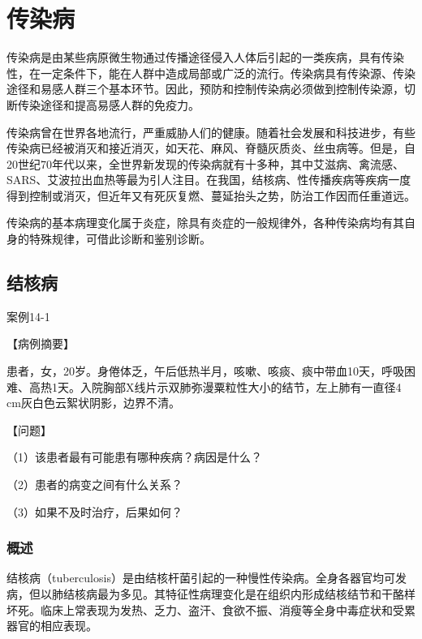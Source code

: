 \chapter{传染病}


传染病是由某些病原微生物通过传播途径侵入人体后引起的一类疾病，具有传染性，在一定条件下，能在人群中造成局部或广泛的流行。传染病具有传染源、传染途径和易感人群三个基本环节。因此，预防和控制传染病必须做到控制传染源，切断传染途径和提高易感人群的免疫力。

传染病曾在世界各地流行，严重威胁人们的健康。随着社会发展和科技进步，有些传染病已经被消灭和接近消灭，如天花、麻风、脊髓灰质炎、丝虫病等。但是，自20世纪70年代以来，全世界新发现的传染病就有十多种，其中艾滋病、禽流感、SARS、艾波拉出血热等最为引人注目。在我国，结核病、性传播疾病等疾病一度得到控制或消灭，但近年又有死灰复燃、蔓延抬头之势，防治工作因而任重道远。

传染病的基本病理变化属于炎症，除具有炎症的一般规律外，各种传染病均有其自身的特殊规律，可借此诊断和鉴别诊断。

\section{结核病}
\begin{framed}
    {案例14-1}

    {【病例摘要】}

    患者，女，20岁。身倦体乏，午后低热半月，咳嗽、咳痰、痰中带血10天，呼吸困难、高热1天。入院胸部X线片示双肺弥漫粟粒性大小的结节，左上肺有一直径4
    cm灰白色云絮状阴影，边界不清。

    {【问题】}

    （1）该患者最有可能患有哪种疾病？病因是什么？

    （2）患者的病变之间有什么关系？

    （3）如果不及时治疗，后果如何？
\end{framed}

\subsection{概述}

结核病（tuberculosis）是由结核杆菌引起的一种慢性传染病。全身各器官均可发病，但以肺结核病最为多见。其特征性病理变化是在组织内形成结核结节和干酪样坏死。临床上常表现为发热、乏力、盗汗、食欲不振、消瘦等全身中毒症状和受累器官的相应表现。

